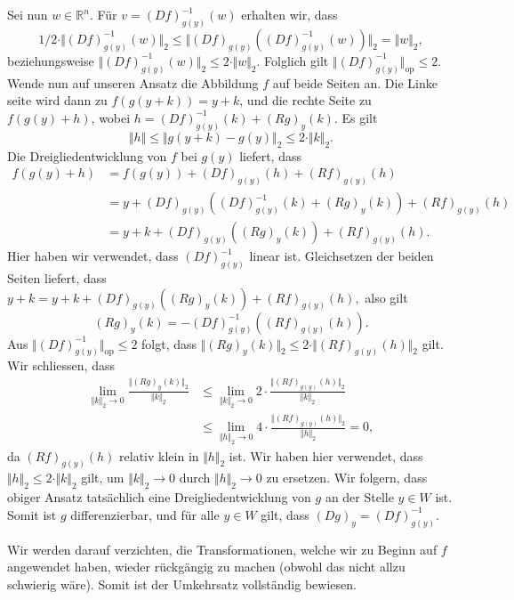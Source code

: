 \documentclass[../main.tex]{subfiles}
\begin{document}
Sei nun $w \in \mathbb{R}^n$. Für  $v = {(Df)}_{g(y)}^{-1}(w)$ erhalten
wir, dass
\[
  1/2 \cdot \Vert {(Df)}^{-1}_{g(y)}(w) \Vert_2
  \leq \Vert {(Df)}_{g(y)}({(Df)}_{g(y)}^{-1}(w)) \Vert_2 = \Vert w \Vert_2,
\]
beziehungsweise 
$\Vert {(Df)}_{g(y)}^{-1}(w) \Vert_2 \leq 2 \cdot \Vert w \Vert_2$.
Folglich gilt $\Vert {(Df)}^{-1}_{g(y)} \Vert_{\text{op}} \leq 2$.
Wende nun auf unseren Ansatz die Abbildung $f$ auf beide Seiten an.
Die Linke seite wird dann zu $f(g(y + k)) = y + k$,
und die rechte Seite zu $f(g(y) + h)$,
wobei $h = {(Df)}^{-1}_{g(y)}(k) + {(Rg)}_y(k)$.
Es gilt
\[
  \Vert h \Vert \leq \Vert g(y + k ) - g(y) \Vert_2
  \leq 2 \cdot \Vert k \Vert_2.
\]
Die Dreigliedentwicklung von $f$ bei $g(y)$ liefert, dass
\begin{align*}
   f(g(y) + h) 
   & = f(g(y)) + {(Df)}_{g(y)}(h) + {(Rf)}_{g(y)}(h) \\
   &= y + {(Df)}_{g(y)}({(Df)}_{g(y)}^{-1}(k) + {(Rg)}_y(k))  
   + {(Rf)}_{g(y)}(h)\\
   &= y + k + {(Df)}_{g(y)}({(Rg)}_y(k)) + {(Rf)}_{g(y)}(h).
\end{align*}
Hier haben wir verwendet, dass ${(Df)}^{-1}_{g(y)}$ linear ist.
Gleichsetzen der beiden Seiten liefert, dass
\(
  y+ k
  = y + k + {(Df)}_{g(y)}({(Rg)}_{y}(k)) + {(Rf)}_{g(y)}(h),
\)
also gilt
\[
  {(Rg)}_y(k) = - {(Df)}_{g(y)}^{-1}({(Rf)}_{g(y)}(h)).
\]
Aus $\Vert {(Df)}^{-1}_{g(y)} \Vert_{\text{op}} \leq 2$ 
folgt, dass $\Vert {(Rg)}_y(k) \Vert_2
\leq 2 \cdot \Vert {(Rf)}_{g(y)}(h) \Vert_2$ gilt.
Wir schliessen, dass
\begin{align*}
  \lim_{\Vert k \Vert_2 \to 0}
  \frac{\Vert {(Rg)}_y(k) \Vert_2}{\Vert k \Vert_2}
  &\leq \lim_{\Vert k \Vert_2 \to 0} 2 \cdot
  \frac{\Vert {(Rf)}_{g(y)}(h) \Vert_2}{\Vert k \Vert_2}\\
  &\leq \lim_{\Vert h \Vert_2 \to 0}
  4 \cdot \frac{\Vert {(Rf)}_{g(y)}(h) \Vert_2}{\Vert h \Vert_2}  = 0,
\end{align*}
da ${(Rf)}_{g(y)}(h)$ relativ klein in $\Vert h \Vert_2$ ist.
Wir haben hier verwendet, dass $\Vert h \Vert_2 \leq 2 \cdot \Vert k \Vert_2$ 
gilt, um $\Vert k \Vert_2 \to 0$ durch $\Vert h \Vert_2 \to 0$ zu ersetzen.
Wir folgern, dass obiger Ansatz tatsächlich
eine Dreigliedentwicklung von $g$ an der Stelle $y \in W$ ist.
Somit ist $g$ differenzierbar, und für alle
$y \in W$ gilt, dass
${(Dg)}_y = {(Df)}_{g(y)}^{-1}$.

Wir werden darauf verzichten, 
die Transformationen, welche wir zu Beginn auf $f$ angewendet haben,
wieder rückgängig zu machen (obwohl das nicht allzu schwierig wäre).
Somit ist der Umkehrsatz vollständig bewiesen.
\end{document}
